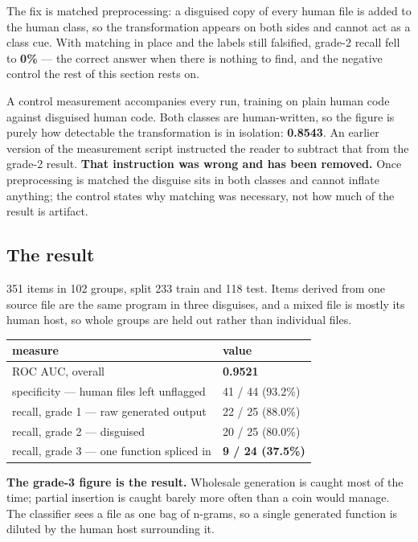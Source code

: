 The fix is matched preprocessing: a disguised copy of every human file
is added to the human class, so the transformation appears on both sides
and cannot act as a class cue. With matching in place and the labels
still falsified, grade-2 recall fell to \textbf{0\%} --- the correct
answer when there is nothing to find, and the negative control the rest
of this section rests on.

A control measurement accompanies every run, training on plain human
code against disguised human code. Both classes are human-written, so
the figure is purely how detectable the transformation is in isolation:
\textbf{0.8543}. An earlier version of the measurement script instructed
the reader to subtract that from the grade-2 result. \textbf{That
instruction was wrong and has been removed.} Once preprocessing is
matched the disguise sits in both classes and cannot inflate anything;
the control states why matching was necessary, not how much of the
result is artifact.

\hypertarget{the-result}{%
\subsection{The result}\label{the-result}}

351 items in 102 groups, split 233 train and 118 test. Items derived
from one source file are the same program in three disguises, and a
mixed file is mostly its human host, so whole groups are held out rather
than individual files.

\begin{longtable}[]{@{}ll@{}}
\toprule\noalign{}
measure & value \\
\midrule\noalign{}
\endhead
\bottomrule\noalign{}
\endlastfoot
ROC AUC, overall & \textbf{0.9521} \\
specificity --- human files left unflagged & 41 / 44 (93.2\%) \\
recall, grade 1 --- raw generated output & 22 / 25 (88.0\%) \\
recall, grade 2 --- disguised & 20 / 25 (80.0\%) \\
recall, grade 3 --- one function spliced in & \textbf{9 / 24
(37.5\%)} \\
\end{longtable}

\textbf{The grade-3 figure is the result.} Wholesale generation is
caught most of the time; partial insertion is caught barely more often
than a coin would manage. The classifier sees a file as one bag of
n-grams, so a single generated function is diluted by the human host
surrounding it.

